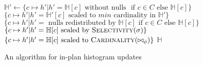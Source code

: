   \begin{algorithmic}
    
		\State $\mathbb{H'} \gets \{ c \mapsto h' | h' = \mathbb{H}[c] \text{ without nulls } \text{ if } c \in C \text{ else } \mathbb{H}[c] \}$
		\State $\{ c \mapsto h' | h' = \mathbb{H'}[c] \text{ scaled to } min \text{ cardinality in } \mathbb{H'} \}$
	\State $\{ c \mapsto h' | h' = \text{ nulls redistributed by } \mathbb{H}[c]  \text{ if } c \in C \text{ else } \mathbb{H}[c]\}$
		\State $\{ c \mapsto h' | h' = \mathbb{H}[c] \text{ scaled by } \Call{Selectivity}{\sigma} \}$
		\State $\{ c \mapsto h' | h' = \mathbb{H}[c] \text{ scaled to } \Call{Cardinality}{\bowtie_{\phi}} \}$
	\Else
		\State $\mathbb{H}$
	\EndIf
    \EndFunction
  \end{algorithmic}
  \caption{An algorithm for in-plan histogram updates}
  \label{algo:histogram-transformation}
